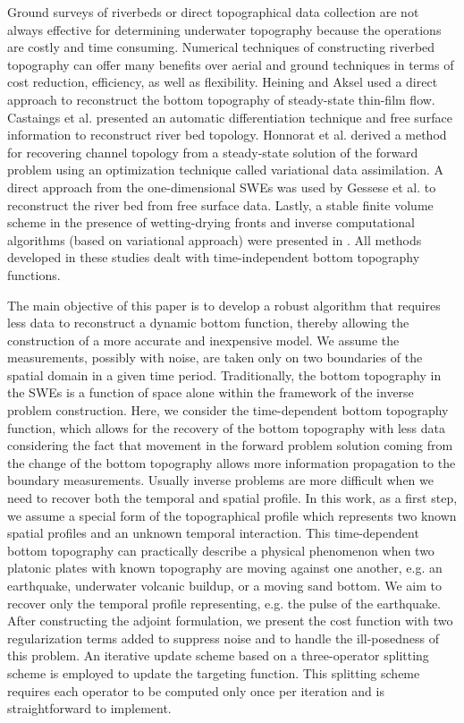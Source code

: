 Ground surveys of riverbeds or direct topographical data collection are not always effective for determining underwater topography because the operations are costly and time consuming. 
Numerical techniques of constructing riverbed topography can offer many benefits over aerial and ground techniques in terms of cost reduction, efficiency, as well as flexibility. Heining and Aksel \cite{Heining2009BottomStability} used a direct approach to reconstruct the bottom topography of steady-state thin-film flow. Castaings et al. \cite{Castaings2006AutomaticModeling} presented an automatic differentiation technique and free surface information to reconstruct river bed topology. Honnorat et al. \cite{Honnorat2007DassflowFlows} derived a method for recovering channel topology from a steady-state solution of the forward problem using an optimization technique called variational data assimilation. A direct approach from the one-dimensional SWEs was used by Gessese et al. \cite{Gessese2011ReconstructionFlow} to reconstruct the river bed from free surface data. Lastly, a stable finite volume scheme in the presence of wetting-drying fronts and inverse computational algorithms (based on variational approach) were presented in \cite{Monnier2016InverseDynamics}. All methods developed in these studies dealt with time-independent bottom topography functions. 

The main objective of this paper is to develop a robust algorithm that requires less data to reconstruct a dynamic bottom function, thereby allowing the construction of a more accurate and inexpensive model. We assume the measurements, possibly with noise, are taken only on two boundaries of the spatial domain in a given time period. Traditionally, the bottom topography in the SWEs is a function of space alone within the framework of the inverse problem construction. Here, we consider the time-dependent bottom topography function, which
allows for the recovery of the bottom topography with less data considering the fact that movement in the forward problem solution coming from the change of the bottom topography allows more information propagation to the boundary measurements.
Usually inverse problems are more difficult when we need to recover both the temporal and spatial profile. In this work, as a first step, we assume a special form of the topographical profile which represents two known spatial profiles and an unknown temporal interaction. This time-dependent bottom topography can practically describe a physical phenomenon when two platonic plates with known topography are moving against one another, e.g. an earthquake, underwater volcanic buildup, or a moving sand bottom. We aim to recover only the temporal profile representing, e.g. the pulse of the earthquake. After constructing the adjoint formulation, we present the cost function with two regularization terms added to suppress noise and to handle the ill-posedness of this problem. An iterative update scheme based on a three-operator splitting scheme is employed to update the targeting function. This splitting scheme requires each operator to be computed only once per iteration and is straightforward to implement.


